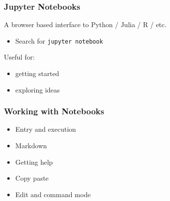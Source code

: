 \documentclass[
    xcolor={svgnames,dvipsnames},
    hyperref={colorlinks, citecolor=DeepPink4, linkcolor=DarkRed, urlcolor=DarkBlue}
    ]{beamer}  %
\newcommand{\1}{\mathbbm 1}
\begin{document}
\begin{frame}
    \frametitle{Jupyter Notebooks}

    A browser based interface to Python / Julia / R / etc.


    \vspace{2em}

    \begin{itemize}
        \item Search for \texttt{jupyter notebook}
    \end{itemize}

    \vspace{2em}

    Useful for:

    \begin{itemize}
        \item getting started
        \item exploring ideas
    \end{itemize}

\end{frame}



\begin{frame}
    \frametitle{Working with Notebooks}

    \begin{itemize}
        \item Entry and execution
    \vspace{1em}
        \item Markdown
    \vspace{1em}
        \item Getting help
    \vspace{1em}
        \item Copy paste
    \vspace{1em}
        \item Edit and command mode
    \end{itemize}

\end{frame}
\end{document}
